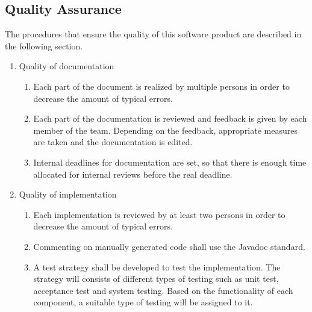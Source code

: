 \subsection{Quality Assurance}
The procedures that ensure the quality of this software product are described in the following section.
\begin{enumerate}
	\item Quality of documentation
	\begin{enumerate}
		\item Each part of the document is realized by multiple persons in order to decrease the amount of typical errors.
		\item Each part of the documentation is reviewed and feedback is given by each member of the team. Depending on the feedback, appropriate measures are taken and the documentation is edited.
		\item Internal deadlines for documentation are set, so that there is enough time allocated for internal reviews before the real deadline.
	\end{enumerate}
	\item Quality of implementation
	\begin{enumerate}
		\item Each implementation is reviewed by at least two persons in order to decrease the amount of typical errors.
		\item Commenting on manually generated code shall use the Javadoc standard.
		\item A test strategy shall be developed to test the implementation. The strategy will consists of different types of testing such as unit test, acceptance test and system testing. Based on the functionality of each component, a suitable type of testing will be assigned to it. 
	\end{enumerate}
\end{enumerate}